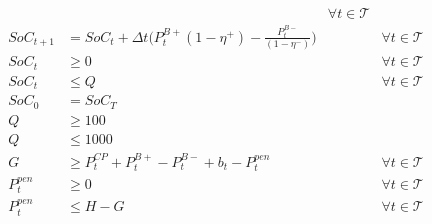\documentclass{article}
\begin{document}
\begin{align}
                                                     &                                                                                                & \forall t \in \mathcal{T} \\
      SoC_{t+1}                                      & = SoC_t + \Delta t \Big( P^{B+}_t (1 - \eta^{+} ) - \frac{ P^{B-}_t }{ (1 - \eta^{-} ) } \Big)
                                                     &                                                                                                & \forall t \in \mathcal{T} \\
      SoC_{t}                                        & \ge 0
                                                     &                                                                                                & \forall t \in \mathcal{T} \\
      SoC_{t}                                        & \le Q
                                                     &                                                                                                & \forall t \in \mathcal{T} \\
      SoC_{0}                                        & = SoC_{T}
                                                     &                                                                                                &                           \\
      Q                                              & \ge 100
                                                     &                                                                                                &                           \\
      Q                                              & \le 1000
                                                     &                                                                                                &                           \\
      G                                              & \ge  P^{CP}_{t} + P^{B+}_{t} - P^{B-}_{t} + b_t - P^{pen}_{t}
                                                     &                                                                                                & \forall t \in \mathcal{T} \\
      P^{pen}_{t}                                    & \ge 0
                                                     &                                                                                                & \forall t \in \mathcal{T} \\
      P^{pen}_{t}                                    & \le H - G
                                                     &                                                                                                & \forall t \in \mathcal{T}
\end{align}
\end{document}
